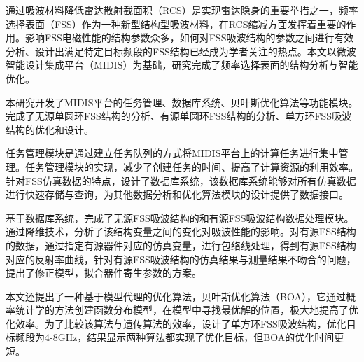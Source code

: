 \newpage

\Cnabstract
{
通过吸波材料降低雷达散射截面积（RCS）是实现雷达隐身的重要举措之一，频率选择表面（FSS）作为一种新型结构型吸波材料，在RCS缩减方面发挥着重要的作用。影响FSS电磁性能的结构参数众多，如何对FSS吸波结构的参数之间进行有效分析、设计出满足特定目标频段的FSS结构已经成为学者关注的热点。本文以微波智能设计集成平台（MIDIS）为基础，研究完成了频率选择表面的结构分析与智能优化。

本研究开发了MIDIS平台的任务管理、数据库系统、贝叶斯优化算法等功能模块。完成了无源单圆环FSS结构的分析、有源单圆环FSS结构的分析、单方环FSS吸波结构的优化和设计。

任务管理模块是通过建立任务队列的方式将MIDIS平台上的计算任务进行集中管理。任务管理模块的实现，减少了创建任务的时间、提高了计算资源的利用效率。针对FSS仿真数据的特点，设计了数据库系统，该数据库系统能够对所有仿真数据进行快速存储与查询，为其他数据分析和优化算法模块的设计提供了数据接口。

基于数据库系统，完成了无源FSS吸波结构的和有源FSS吸波结构数据处理模块。通过降维技术，分析了该结构变量之间的变化对吸波性能的影响。对有源FSS结构的数据，通过指定有源器件对应的仿真变量，进行包络线处理，得到有源FSS结构对应的反射率曲线，针对有源FSS吸波结构的仿真结果与测量结果不吻合的问题，提出了修正模型，拟合器件寄生参数的方案。

本文还提出了一种基于模型代理的优化算法，贝叶斯优化算法（BOA），它通过概率统计学的方法创建函数分布模型，在模型中寻找最优解的位置，极大地提高了优化效率。为了比较该算法与遗传算法的效率，设计了单方环FSS吸波结构，优化目标频段为4-8GHz，结果显示两种算法都实现了优化目标，但BOA的优化时间更短。
        
}

